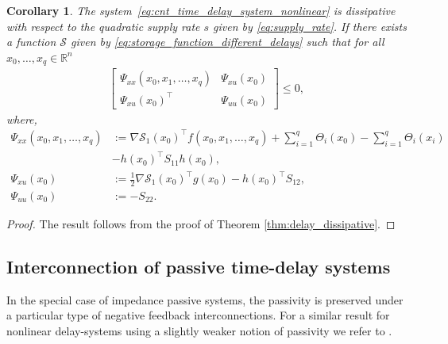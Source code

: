 \documentclass[12pt]{article}
\newtheorem{corollary}{Corollary}
\begin{document}
\begin{corollary}
The system~\eqref{eq:cnt_time_delay_system_nonlinear} is dissipative with respect to the quadratic supply rate $s$ given by \eqref{eq:supply_rate}. If there exists a function $\mathcal{S}$ given by \eqref{eq:storage_function_different_delays} such that for all $x_0,\ldots,x_q\in\mathbb{R}^n$
\begin{align*}
    \begin{bmatrix}
    \Psi_{xx}(x_0,x_1,\ldots,x_q) & \Psi_{xu}(x_0)\\ \Psi_{xu}(x_0)^\top & \Psi_{uu}(x_0)
\end{bmatrix}\leq 0,
\end{align*}
where,
\begin{align*}
 \Psi_{xx}(x_0,x_1,\ldots,x_q)&:=\nabla\mathcal{S}_1(x_0)^\top f(x_0,x_1,\ldots,x_q)+\sum_{i=1}^q\Theta_i(x_0)-\sum_{i=1}^q\Theta_i(x_i)\\
 &-h(x_0)^\top S_{11}h(x_0),\\
  \Psi_{xu}(x_0)&:=\tfrac{1}{2}\nabla\mathcal{S}_1(x_0)^\top g(x_0)-h(x_0)^\top S_{12},\\
  \Psi_{uu}(x_0)&:=-S_{22}.
\end{align*}
\end{corollary}
\begin{proof}
 The result follows from the proof of Theorem \ref{thm:delay_dissipative}.
\end{proof}

\subsection{Interconnection of passive time-delay systems}
In the special case of impedance passive systems, the passivity is preserved under a particular type of negative feedback interconnections. For a similar result for nonlinear delay-systems using a slightly weaker notion of passivity we refer to \cite{kawano2023passivity}. 
\end{document}
